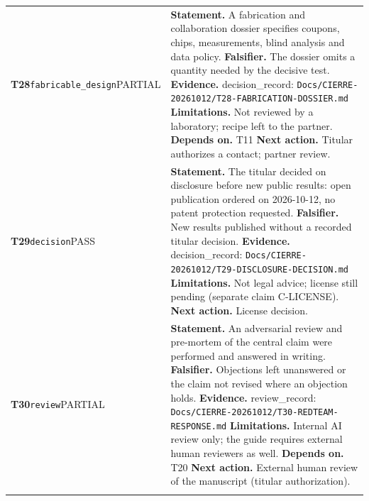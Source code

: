 \begin{longtable}{@{}>{\raggedright\arraybackslash}p{2.35cm}>{\raggedright\arraybackslash}p{13.2cm}@{}}
\textbf{T28}\newline \texttt{fabricable\_\allowbreak{}design}\newline PARTIAL & \textbf{Statement.} A fabrication and collaboration dossier specifies coupons, chips, measurements, blind analysis and data policy. \newline \textbf{Falsifier.} The dossier omits a quantity needed by the decisive test. \newline \textbf{Evidence.} decision\_\allowbreak{}record: \texttt{Docs/\allowbreak{}CIERRE-20261012/\allowbreak{}T28-FABRICATION-DOSSIER.md} \newline \textbf{Limitations.} Not reviewed by a laboratory; recipe left to the partner. \newline \textbf{Depends on.} T11 \newline \textbf{Next action.} Titular authorizes a contact; partner review. \\ \addlinespace[2pt]
\textbf{T29}\newline \texttt{decision}\newline PASS & \textbf{Statement.} The titular decided on disclosure before new public results: open publication ordered on 2026-10-12, no patent protection requested. \newline \textbf{Falsifier.} New results published without a recorded titular decision. \newline \textbf{Evidence.} decision\_\allowbreak{}record: \texttt{Docs/\allowbreak{}CIERRE-20261012/\allowbreak{}T29-DISCLOSURE-DECISION.md} \newline \textbf{Limitations.} Not legal advice; license still pending (separate claim C-LICENSE). \newline \textbf{Next action.} License decision. \\ \addlinespace[2pt]
\textbf{T30}\newline \texttt{review}\newline PARTIAL & \textbf{Statement.} An adversarial review and pre-mortem of the central claim were performed and answered in writing. \newline \textbf{Falsifier.} Objections left unanswered or the claim not revised where an objection holds. \newline \textbf{Evidence.} review\_\allowbreak{}record: \texttt{Docs/\allowbreak{}CIERRE-20261012/\allowbreak{}T30-REDTEAM-RESPONSE.md} \newline \textbf{Limitations.} Internal AI review only; the guide requires external human reviewers as well. \newline \textbf{Depends on.} T20 \newline \textbf{Next action.} External human review of the manuscript (titular authorization). \\ \addlinespace[2pt]

\end{longtable}
